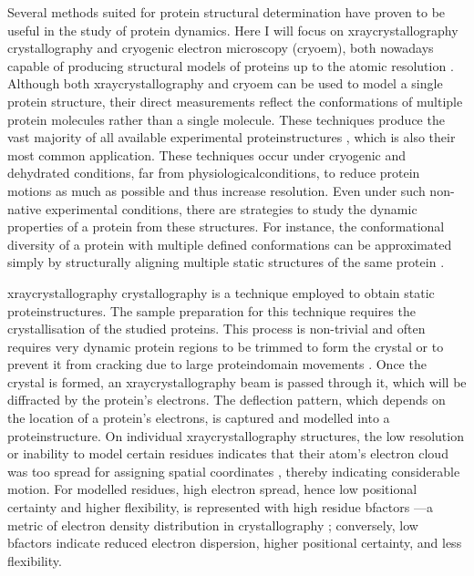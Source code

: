 Several methods suited for protein structural determination have proven to be useful in the study of protein \gls{dynamics}. Here I will focus on \gls{xraycrystallography} crystallography and cryogenic electron \gls{microscopy} (\gls{cryoem}), both nowadays capable of producing structural models of proteins up to the atomic resolution \cite{yip_atomic-resolution_2020}. Although both \gls{xraycrystallography} and \gls{cryoem} can be used to model a single protein structure, their direct measurements reflect the conformations of multiple protein molecules rather than a single molecule. These techniques produce the vast majority of all available experimental \glspl{proteinstructure} \cite{noauthor_pdb_nodate_overal_statistics, noauthor_pdb_nodate_xray, noauthor_pdb_nodate_nmr, noauthor_pdb_nodate_cryoem}, which is also their most common application. These techniques occur under cryogenic and dehydrated conditions, far from \gls{physiologicalconditions}, to reduce protein motions as much as possible and thus increase resolution. Even under such non-native experimental conditions, there are strategies to study the dynamic properties of a protein from these structures. For instance, the conformational diversity of a protein with multiple defined \glspl{conformation} can be approximated simply by structurally aligning multiple static structures of the same protein \cite{monzon_codnas_2013, monzon_codnas_2016}. 


\gls{xraycrystallography} crystallography is a technique employed to obtain static \glspl{proteinstructure}. The sample preparation for this technique requires the crystallisation of the studied proteins. This process is non-trivial and often requires very dynamic protein regions to be trimmed to form the crystal or to prevent it from cracking due to large \gls{proteindomain} movements \cite{mooij_proteinccd_2009, gavrilov_nmr_2018}. Once the crystal is formed, an \gls{xraycrystallography} beam is passed through it, which will be diffracted by the protein's \glspl{electron}. The deflection pattern, which depends on the location of a protein's \glspl{electron}, is captured and modelled into a \gls{proteinstructure}. On individual \gls{xraycrystallography} structures, the low resolution or inability to model certain residues indicates that their atom's \gls{electron} cloud was too spread for assigning spatial coordinates \cite{smyth_x_2000}, thereby indicating considerable motion. For modelled residues, high \gls{electron} spread, hence low positional certainty and higher \gls{flexibility}, is represented with high residue \glspl{bfactor} —a metric of \gls{electron} density distribution in crystallography \cite{smyth_x_2000, carugo_b-factor_2022}; conversely, low \glspl{bfactor} indicate reduced \gls{electron} dispersion, higher positional certainty, and less \gls{flexibility}.


